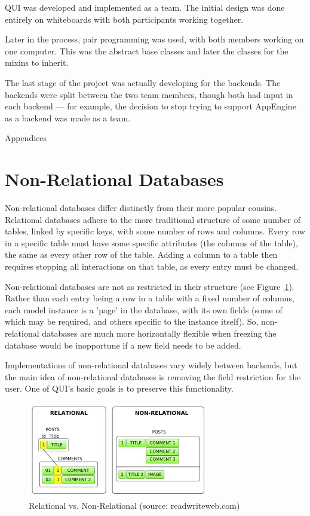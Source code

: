 \documentclass{article} %
\begin{document}
QUI was developed and implemented as a team. The initial design was done entirely on whiteboards with both participants working together.

  Later in the process, pair programming was used, with both members working on one computer. This was the abstract base classes and later the classes for the mixins to inherit. 
  
  The last stage of the project was actually developing for the backends. The backends were split between the two team members, though both had input in each backend --- for example, the
   decision to stop trying to support AppEngine as a backend was made as a team.

\newpage
\appendix
\begin{center}Appendices\end{center}

\section{Non-Relational Databases}
Non-relational databases differ distinctly from their more popular cousins. Relational databases adhere to the more traditional structure of some number of tables, linked
by specific keys, with some number of rows and columns. Every row in a specific table must have some specific attributes (the columns of the table), the same as every 
other row of the table. Adding a column to a table then requires stopping all interactions on that table, as every entry must be changed. 

Non-relational databases are not as restricted in their structure (see Figure~\ref{fig:reltab}). Rather than each entry being a row in a table with a fixed number of 
columns, each model instance is a 'page' in the database, with its own fields (some of which may be required, and others specific to the instance itself). So, 
non-relational databases are much more horizontally flexible when freezing the database would be inopportune if a new field needs to be added.

Implementations of non-relational databases vary widely between backends, but the main idea of non-relational databases is removing the field restriction for the user.
One of QUI's basic goals is to preserve this functionality. 
\begin{figure}[htb]
\centering
\includegraphics[width=300px]{RelNonRel}
\caption{Relational vs. Non-Relational (source: readwriteweb.com) }
\label{fig:reltab}
\end{figure}
\end{document}
